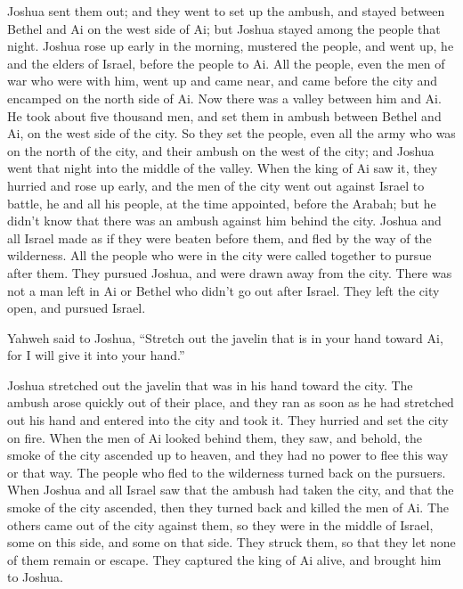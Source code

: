  Joshua sent them out; and they went to set up the ambush,
and stayed between Bethel and Ai on the west side of Ai; but Joshua
stayed among the people that night.  Joshua rose up early
in the morning, mustered the people, and went up, he and the elders of
Israel, before the people to Ai.  All the people, even the
men of war who were with him, went up and came near, and came before the
city and encamped on the north side of Ai. Now there was a valley
between him and Ai.  He took about five thousand men, and
set them in ambush between Bethel and Ai, on the west side of the city.
 So they set the people, even all the army who was on the
north of the city, and their ambush on the west of the city; and Joshua
went that night into the middle of the valley.  When the
king of Ai saw it, they hurried and rose up early, and the men of the
city went out against Israel to battle, he and all his people, at the
time appointed, before the Arabah; but he didn't know that there was an
ambush against him behind the city.  Joshua and all Israel
made as if they were beaten before them, and fled by the way of the
wilderness.  All the people who were in the city were
called together to pursue after them. They pursued Joshua, and were
drawn away from the city.  There was not a man left in Ai
or Bethel who didn't go out after Israel. They left the city open, and
pursued Israel.

 Yahweh said to Joshua, ``Stretch out the javelin that is
in your hand toward Ai, for I will give it into your hand.''

Joshua stretched out the javelin that was in his hand toward the city.
 The ambush arose quickly out of their place, and they ran
as soon as he had stretched out his hand and entered into the city and
took it. They hurried and set the city on fire.  When the
men of Ai looked behind them, they saw, and behold, the smoke of the
city ascended up to heaven, and they had no power to flee this way or
that way. The people who fled to the wilderness turned back on the
pursuers.  When Joshua and all Israel saw that the ambush
had taken the city, and that the smoke of the city ascended, then they
turned back and killed the men of Ai.  The others came out
of the city against them, so they were in the middle of Israel, some on
this side, and some on that side. They struck them, so that they let
none of them remain or escape.  They captured the king of
Ai alive, and brought him to Joshua.

